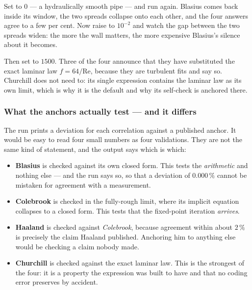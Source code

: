 \documentclass[11pt,a4paper]{article}
\begin{document}
\begin{tryit}
Set  to $0$ --- a hydraulically smooth pipe --- and run
again.  Blasius comes back inside its window, the two spreads collapse
onto each other, and the four answers agree to a few per cent.  Now raise
 to $10^{-2}$ and watch the gap between the two spreads
widen: the more the wall matters, the more expensive Blasius's silence
about it becomes.

Then set  to $1500$.  Three of the four announce that they have
substituted the exact laminar law $f = 64/\mathrm{Re}$, because they are
turbulent fits and say so.  Churchill does not need to: its single
expression contains the laminar law as its own limit, which is why it is
the default and why its self-check is anchored there.
\end{tryit}

\subsubsection*{What the anchors actually test --- and it differs}

The run prints a deviation for each correlation against a published
anchor.  It would be easy to read four small numbers as four validations.
They are not the same kind of statement, and the output says which is
which:

\begin{itemize}[leftmargin=*,nosep,topsep=2pt]
  \item \textbf{Blasius} is checked against its own closed form.  This
        tests the \emph{arithmetic} and nothing else --- and the run says
        so, so that a deviation of $0.000\,\%$ cannot be mistaken for
        agreement with a measurement.
  \item \textbf{Colebrook} is checked in the fully-rough limit, where its
        implicit equation collapses to a closed form.  This tests that the
        fixed-point iteration \emph{arrives}.
  \item \textbf{Haaland} is checked against \emph{Colebrook}, because
        agreement within about $2\,\%$ is precisely the claim Haaland
        published.  Anchoring him to anything else would be checking a
        claim nobody made.
  \item \textbf{Churchill} is checked against the exact laminar law.  This
        is the strongest of the four: it is a property the expression was
        built to have and that no coding error preserves by accident.
\end{itemize}
\end{document}
